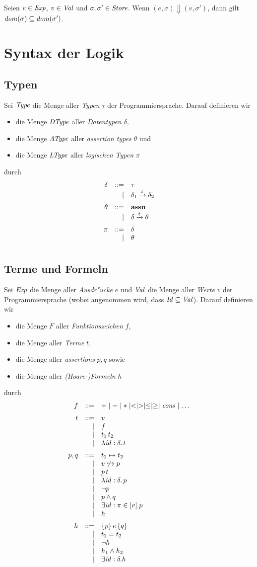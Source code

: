 \documentclass[12pt,a4paper,bigheadings]{scrartcl}
\newcommand{\assn}{\ensuremath{\mathbf{assn}}}
\newcommand{\Dtype}{\name{DType}}
\newcommand{\Atype}{\name{AType}}
\newcommand{\tto}{\ensuremath{\xrightarrow{t}}}
\renewcommand{\disjoint}[2]{\ensuremath{#2\not\hookrightarrow#1}}
\begin{document}
\begin{lemma} \label{lemma:big_steps_und_dom_sigma}
  Seien $e\in{\text{\it Exp\/}}$, $v\in{\text{\it Val\/}}$ und $\sigma,\sigma'\in{\text{\it Store\/}}$. Wenn
  $(e,\sigma) \Downarrow (v,\sigma')$, dann gilt ${\text{\it dom\/}}(\sigma) \subseteq {\text{\it dom\/}}(\sigma')$.
\end{lemma}


\section{Syntax der Logik}

\subsection{Typen}

Sei ${\text{\it Type\/}}$ die Menge aller {\em Typen} $\tau$ der Programmiersprache. Darauf definieren wir 
\begin{itemize}
  \item die Menge $\Dtype$ aller {\em Datentypen} $\delta$,
  \item die Menge $\Atype$ aller {\em assertion types} $\theta$ und
  \item die Menge ${\text{\it LType\/}}$ aller {\em logischen Typen} $\pi$
\end{itemize}
durch
\[\bgram
\delta  \is \tau
        \al \delta_1 \tto \delta_2
        \n
\theta  \is \assn
        \al \delta \tto \theta
        \n
\pi \is \delta
    \al \theta
    \n
\egram\]

\subsection{Terme und Formeln}

Sei ${\text{\it Exp\/}}$ die Menge aller {\em Ausdr"ucke} $e$ und ${\text{\it Val\/}}$ die Menge aller {\em Werte} $v$
der Programmiersprache (wobei angenommen wird, dass ${\text{\it Id\/}} \subseteq {\text{\it Val\/}}$). Darauf definieren wir 
\begin{itemize}
  \item die Menge $F$ aller {\em Funktionszeichen} $f$,
  \item die Menge  aller {\em Terme} $t$,
  \item die Menge  aller {\em assertions} $p,q$ sowie
  \item die Menge  aller {\em (Hoare-)Formeln} $h$
\end{itemize}
durch
\[\bgram
f \is + \mid - \mid * \mid < \mid > \mid \le \mid \ge \mid \Cons \mid \ldots
  \n
t \is v
  \al f
  \al \app{t_1}{t_2}
  \al \abstr{\id:\delta}{t}
  \n
p,q \is t_1 \mapsto t_2
    \al \disjoint{p}{v}
    \al \app{p}{t}
    \al \abstr{\id:\delta}{p}
    \al \neg p
    \al p \wedge q
    \al \exists \id:\pi\in[v]. p
    \al h
    \n
h \is \triple{p}{e}{q}
  \al t_1 = t_2
  \al \neg h
  \al h_1 \wedge h_2
  \al \exists \id:\delta. h
\egram\]
\end{document}
